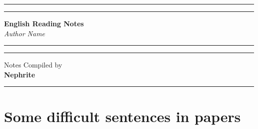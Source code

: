 \documentclass{book}
\newcommand{\booktitle}{English Reading Notes}
\newcommand{\authorname}{Author Name}
\newcommand{\yourname}{Nephrite}
\begin{document}

\begin{titlepage}
    \begin{center}
        \vspace*{2cm}

        \hrule height 3pt \vspace{2pt} \hrule height 1pt width 0.4\textwidth \vspace{1cm}

        {\Huge \textbf{\textcolor{coverblue}{\booktitle}}}\\[0.5cm]

        {\LARGE \textit{\textcolor{textgray}{\authorname}}}\\[1cm]

        \hrule height 1pt \vspace{2pt} \hrule height 3pt \vspace{3cm}

        {\Large \textcolor{textgray}{Notes Compiled by}}\\[0.5cm]
        {\LARGE \textbf{\yourname}}\\[2cm]

        \vfill
        \hrule height 1pt width 0.25\textwidth
    \end{center}
\end{titlepage}

\tableofcontents
\newpage

\chapter{Some difficult sentences in papers}

\end{document}
